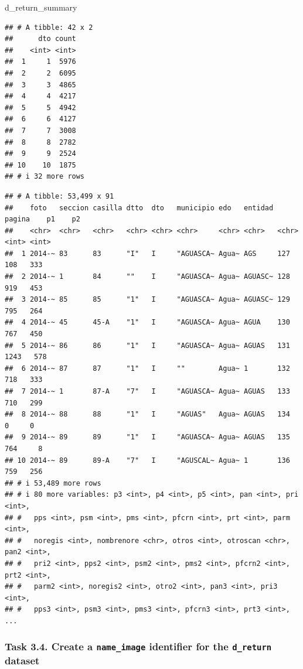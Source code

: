 \documentclass[
]{article}
\newenvironment{Shaded}{\begin{snugshade}}{\end{snugshade}}
\newcommand{\NormalTok}[1]{#1}
\begin{document}
\begin{Shaded}
\begin{Highlighting}[]
\NormalTok{d\_return\_summary}
\end{Highlighting}
\end{Shaded}

\begin{verbatim}
## # A tibble: 42 x 2
##      dto count
##    <int> <int>
##  1     1  5976
##  2     2  6095
##  3     3  4865
##  4     4  4217
##  5     5  4942
##  6     6  4127
##  7     7  3008
##  8     8  2782
##  9     9  2524
## 10    10  1875
## # i 32 more rows
\end{verbatim}

\begin{verbatim}
## # A tibble: 53,499 x 91
##    foto   seccion casilla dtto  dto   municipio edo   entidad pagina    p1    p2
##    <chr>  <chr>   <chr>   <chr> <chr> <chr>     <chr> <chr>   <chr>  <int> <int>
##  1 2014-~ 83      83      "I"   I     "AGUASCA~ Agua~ AGS     127      108   333
##  2 2014-~ 1       84      ""    I     "AGUASCA~ Agua~ AGUASC~ 128      919   453
##  3 2014-~ 85      85      "1"   I     "AGUASCA~ Agua~ AGUASC~ 129      795   264
##  4 2014-~ 45      45-A    "1"   I     "AGUASCA~ Agua~ AGUA    130      767   450
##  5 2014-~ 86      86      "1"   I     "AGUASCA~ Agua~ AGUAS   131     1243   578
##  6 2014-~ 87      87      "1"   I     ""        Agua~ 1       132      718   333
##  7 2014-~ 1       87-A    "7"   I     "AGUASCA~ Agua~ AGUAS   133      710   299
##  8 2014-~ 88      88      "1"   I     "AGUAS"   Agua~ AGUAS   134        0     0
##  9 2014-~ 89      89      "1"   I     "AGUASCA~ Agua~ AGUAS   135      764     8
## 10 2014-~ 89      89-A    "7"   I     "AGUSCAL~ Agua~ 1       136      759   256
## # i 53,489 more rows
## # i 80 more variables: p3 <int>, p4 <int>, p5 <int>, pan <int>, pri <int>,
## #   pps <int>, psm <int>, pms <int>, pfcrn <int>, prt <int>, parm <int>,
## #   noregis <int>, nombrenore <chr>, otros <int>, otroscan <chr>, pan2 <int>,
## #   pri2 <int>, pps2 <int>, psm2 <int>, pms2 <int>, pfcrn2 <int>, prt2 <int>,
## #   parm2 <int>, noregis2 <int>, otro2 <int>, pan3 <int>, pri3 <int>,
## #   pps3 <int>, psm3 <int>, pms3 <int>, pfcrn3 <int>, prt3 <int>, ...
\end{verbatim}

\clearpage

\hypertarget{task-3.4.-create-a-name_image-identifier-for-the-d_return-dataset}{%
\subsubsection{\texorpdfstring{Task 3.4. Create a \texttt{name\_image}
identifier for the \texttt{d\_return}
dataset}{Task 3.4. Create a name\_image identifier for the d\_return dataset}}\label{task-3.4.-create-a-name_image-identifier-for-the-d_return-dataset}}
\end{document}
